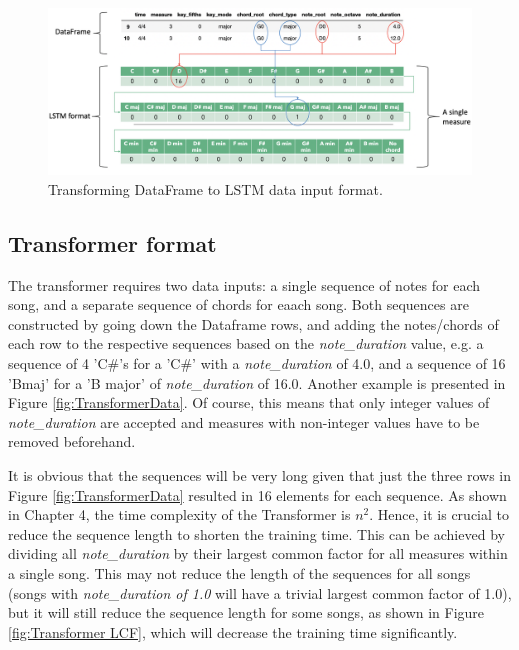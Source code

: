 \begin{figure}
    \centering
    \includegraphics[scale=0.3]{Figures/LSTM pictorial 4}
    \decoRule
    \caption{Transforming DataFrame to LSTM data input format.}
    \label{fig:LSTMData}
\end{figure}
    


\subsection{Transformer format}
The transformer requires two data inputs: a single sequence of notes for each song, and a separate sequence of chords for eaach song. Both sequences are constructed by going down the Dataframe rows, and adding the notes/chords of each row to the respective sequences based on the \emph{note\_duration} value, e.g. a sequence of 4 'C\#'s for a 'C\#' with a \emph{note\_duration} of 4.0, and a sequence of 16 'Bmaj' for a 'B major' of \emph{note\_duration} of 16.0. Another example is presented in Figure \ref{fig:TransformerData}. Of course, this means that only integer values of \emph{note\_duration} are accepted and measures with non-integer values have to be removed beforehand.

It is obvious that the sequences will be very long given that just the three rows in Figure \ref{fig:TransformerData} resulted in 16 elements for each sequence. As shown in Chapter 4, the time complexity of the Transformer is ${n}^2$. Hence, it is crucial to reduce the sequence length to shorten the training time. This can be achieved by dividing all \emph{note\_duration} by their largest common factor for all measures within a single song. This may not reduce the length of the sequences for all songs (songs with \emph{note\_duration of 1.0} will have a trivial largest common factor of 1.0), but it will still reduce the sequence length for some songs, as shown in Figure \ref{fig:Transformer LCF}, which will decrease the training time significantly.


